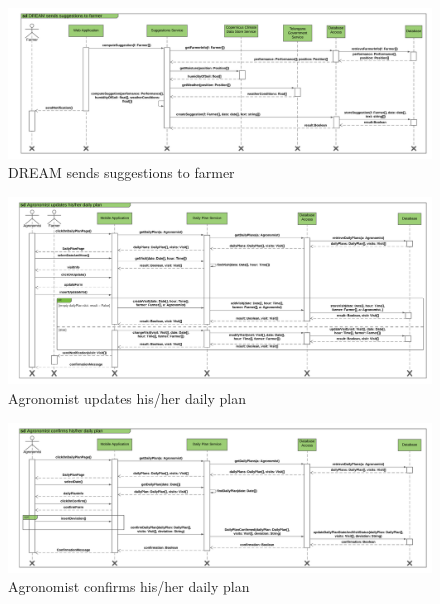 \newpage
\begin{landscape}
\begin{figure}[h]
\vspace*{-2cm}
\noindent
\centering
\centerline{\includegraphics[scale= 0.108]{./Images/DREAM sends suggestions to farmer.png}}
    \caption{DREAM sends suggestions to farmer}
    \vspace*{-12cm}
\end{figure}
\fillandplacepagenumber
\end{landscape}


\newpage
\begin{landscape}
\begin{figure}[h]
\vspace*{-2cm}
\noindent
\centering
\centerline{\includegraphics[scale= 0.108]{./Images/Agronomist updates his_her daily plan.png}}
    \caption{Agronomist updates his/her daily plan}
    \vspace*{-12cm}
\end{figure}
\fillandplacepagenumber
\end{landscape}

\newpage
\begin{landscape}
\begin{figure}[h]
\vspace*{-2cm}
\noindent
\centering
\centerline{\includegraphics[scale= 0.108]{./Images/Agronomist confirms his_her daily plan.png}}
    \caption{Agronomist confirms his/her daily plan}
    \vspace*{-12cm}
\end{figure}
\fillandplacepagenumber
\end{landscape}


